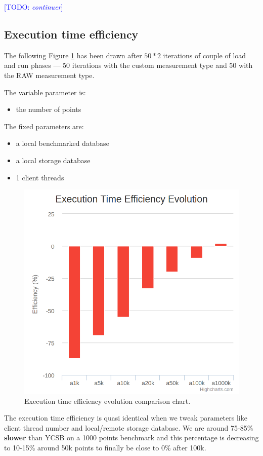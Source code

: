 \documentclass[a4paper,11pt]{report}
\newcommand*{\todo}[1]{\textcolor{blue}{[TODO: \emph{#1}]}}
\begin{document}
\todo{continuer}

\subsection{Execution time efficiency}

The following Figure \ref{execution_50_local_local_1t} has been drawn after $50*2$ iterations of couple of load and run phases --- 50 iterations with the custom measurement type and 50 with the RAW measurement type.

The variable parameter is:
\begin{itemize}
\item
the number of points
\end{itemize}

The fixed parameters are:
\begin{itemize}
\item
a local benchmarked database
\item
a local storage database
\item
1 client threads
\end{itemize}

\begin{figure}[ht]
\begin{center}
\includegraphics[width=0.6\linewidth]{images/execution_50_local_local_1t.png}
\caption{Execution time efficiency evolution comparison chart.}
\label{execution_50_local_local_1t}
\end{center}
\end{figure}

The execution time efficiency is quasi identical when we tweak parameters like client thread number and local/remote storage database. We are around 75-85\% \textbf{slower} than YCSB on a 1000 points benchmark and this percentage is decreasing to 10-15\% around 50k points to finally be close to 0\% after 100k.
\end{document}
